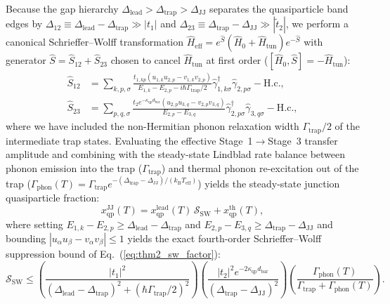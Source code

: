 \documentclass[11pt,letterpaper]{article}
\theoremstyle{definition}
\begin{document}
Because the gap hierarchy $\Delta_{\mathrm{lead}} > \Delta_{\mathrm{trap}} > \Delta_{\mathrm{JJ}}$ separates the quasiparticle band edges by $\Delta_{12} \equiv \Delta_{\mathrm{lead}} - \Delta_{\mathrm{trap}} \gg |t_1|$ and $\Delta_{23} \equiv \Delta_{\mathrm{trap}} - \Delta_{\mathrm{JJ}} \gg |\tilde{t}_2|$, we perform a canonical Schrieffer--Wolff transformation $\hat{H}_{\mathrm{eff}} = e^{\hat{S}} (\hat{H}_0 + \hat{H}_{\mathrm{tun}}) e^{-\hat{S}}$ with generator $\hat{S} = \hat{S}_{12} + \hat{S}_{23}$ chosen to cancel $\hat{H}_{\mathrm{tun}}$ at first order ($[\hat{H}_0, \hat{S}] = -\hat{H}_{\mathrm{tun}}$):
\begin{equation}
\begin{aligned}
  \hat{S}_{12} &= \sum_{k,p,\sigma} \frac{t_{1,kp}(u_{1,k}u_{2,p} - v_{1,k}v_{2,p})}{E_{1,k} - E_{2,p} - i\hbar\Gamma_{\mathrm{trap}}/2} \hat{\gamma}_{1,k\sigma}^\dagger \hat{\gamma}_{2,p\sigma} - \mathrm{H.c.}, \\
  \hat{S}_{23} &= \sum_{p,q,\sigma} \frac{t_2 e^{-\kappa_{\mathrm{qp}} d_{\mathrm{bar}}}(u_{2,p}u_{3,q} - v_{2,p}v_{3,q})}{E_{2,p} - E_{3,q}} \hat{\gamma}_{2,p\sigma}^\dagger \hat{\gamma}_{3,q\sigma} - \mathrm{H.c.},
\end{aligned}
  \label{eq:appC_SW_generators}
\end{equation}
where we have included the non-Hermitian phonon relaxation width $\Gamma_{\mathrm{trap}}/2$ of the intermediate trap states. Evaluating the effective Stage~1$\to$Stage~3 transfer amplitude and combining with the steady-state Lindblad rate balance between phonon emission into the trap ($\Gamma_{\mathrm{trap}}$) and thermal phonon re-excitation out of the trap ($\Gamma_{\mathrm{phon}}(T) = \Gamma_{\mathrm{trap}} e^{-(\Delta_{\mathrm{trap}} - \Delta_{\mathrm{JJ}})/(k_{\mathrm{B}} T_{\mathrm{eff}})}$) yields the steady-state junction quasiparticle fraction:
\begin{equation}
  x_{\mathrm{qp}}^{\mathrm{JJ}}(T) = x_{\mathrm{qp}}^{\mathrm{lead}}(T) \, \mathcal{S}_{\mathrm{SW}} + x_{\mathrm{qp}}^{\mathrm{th}}(T),
  \label{eq:appC_steady_state_xqp}
\end{equation}
where setting $E_{1,k} - E_{2,p} \ge \Delta_{\mathrm{lead}} - \Delta_{\mathrm{trap}}$ and $E_{2,p} - E_{3,q} \ge \Delta_{\mathrm{trap}} - \Delta_{\mathrm{JJ}}$ and bounding $|u_{\alpha} u_{\beta} - v_{\alpha} v_{\beta}| \le 1$ yields the exact fourth-order Schrieffer--Wolff suppression bound of Eq.~(\ref{eq:thm2_sw_factor}):
\begin{equation}
  \mathcal{S}_{\mathrm{SW}} \le \left(\frac{|t_1|^2}{(\Delta_{\mathrm{lead}} - \Delta_{\mathrm{trap}})^2 + (\hbar\Gamma_{\mathrm{trap}}/2)^2}\right) \left(\frac{|t_2|^2 e^{-2\kappa_{\mathrm{qp}} d_{\mathrm{bar}}}}{(\Delta_{\mathrm{trap}} - \Delta_{\mathrm{JJ}})^2}\right) \left(\frac{\Gamma_{\mathrm{phon}}(T)}{\Gamma_{\mathrm{trap}} + \Gamma_{\mathrm{phon}}(T)}\right).
  \label{eq:appC_sw_bound_final}
\end{equation}
\end{document}
